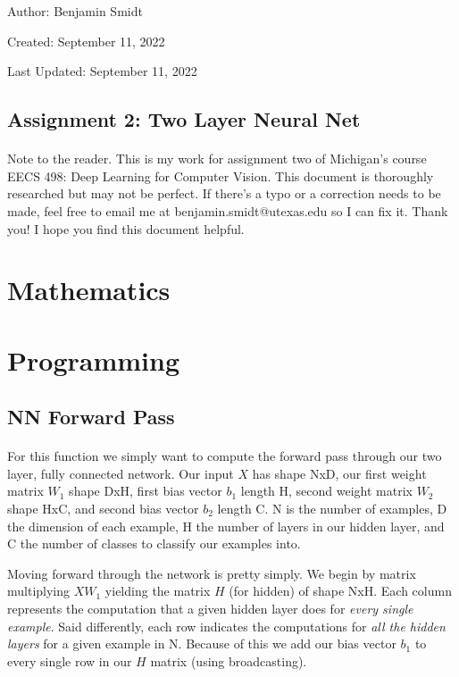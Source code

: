 \documentclass[12pt]{article}
\begin{document}
\noindent Author: Benjamin Smidt

\noindent Created: September 11, 2022

\noindent Last Updated: September 11, 2022
\begin{center}
\section*{Assignment 2: Two Layer Neural Net}
\end{center}

\paragraph{} Note to the reader. This is my work for assignment two of Michigan's course
EECS 498: Deep Learning for Computer Vision. This document is thoroughly researched but
may not be perfect. If there's a typo or a correction needs to be made, feel free to 
email me at benjamin.smidt@utexas.edu so I can fix it. Thank you! I hope you find this 
document helpful.

\section{Mathematics}

\section{Programming}

\subsection{NN Forward Pass}
\paragraph{}
For this function we simply want to compute the forward pass through our two layer, fully connected 
network. Our input $X$ has shape NxD, our first weight matrix $W_1$ shape DxH, first 
bias vector $b_1$ length H, second weight matrix $W_2$ shape HxC, and second bias vector
$b_2$ length C. N is the number of examples, D the dimension of each example, H the number
of layers in our hidden layer, and C the number of classes to classify our examples into. 

Moving forward through the network is pretty simply. We begin by matrix multiplying 
$XW_1$ yielding the matrix $H$ (for hidden) of shape NxH. Each column represents the computation
that a given hidden layer does for \emph{every single example}. Said differently, each row
indicates the computations for \emph{all the hidden layers} for a given example in N. 
Because of this we add our bias vector $b_1$ to every single row in our $H$ matrix
(using broadcasting). 
\end{document}
